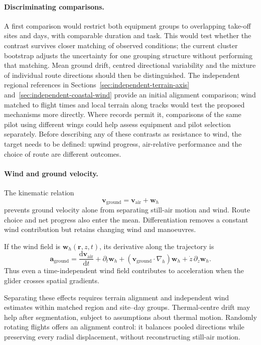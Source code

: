 \paragraph{Discriminating comparisons.}
A first comparison would restrict both equipment groups to overlapping take-off
sites and days, with comparable duration and task. This would test whether the
contrast survives closer matching of observed conditions; the current cluster
bootstrap adjusts the uncertainty for one grouping structure without performing
that matching. Mean ground drift, centred directional variability and the mixture
of individual route directions should then be distinguished. The independent
regional references in Sections~\ref{sec:independent-terrain-axis}
and~\ref{sec:independent-coastal-wind} provide an initial alignment comparison;
wind matched to flight times and local terrain along tracks would test the
proposed mechanisms more directly.
Where records permit it, comparisons of the same pilot using different wings could
help assess equipment and pilot selection separately. Before describing any of
these contrasts as resistance to wind, the target needs to be defined: upwind
progress, air-relative performance and the choice of route are different outcomes.

\paragraph{Wind and ground velocity.}

The kinematic relation
\begin{equation}
  \mathbf v_{\mathrm{ground}}=\mathbf v_{\mathrm{air}}+\mathbf w_h
  \label{eq:ground-air-wind}
\end{equation}
prevents ground velocity alone from separating still-air motion and wind.
Route choice and net progress also enter the mean. Differentiation removes a
constant wind contribution but retains changing wind and manoeuvres.

If the wind field is $\mathbf w_h(\mathbf r,z,t)$, its derivative along the trajectory is
\begin{equation}
 \mathbf a_{\mathrm{ground}}
 =\frac{\mathrm d\mathbf v_{\mathrm{air}}}{\mathrm dt}
  +\partial_t\mathbf w_h
  +(\mathbf v_{\mathrm{ground}}\!\cdot\nabla_h)\mathbf w_h
  +\dot z\,\partial_z\mathbf w_h.
 \label{eq:wind-acceleration}
\end{equation}
Thus even a time-independent wind field contributes to acceleration when the glider
crosses spatial gradients.

Separating these effects requires terrain alignment and independent wind estimates
within matched region and site--day groups. Thermal-centre drift may help after
segmentation, subject to assumptions about thermal motion. Randomly rotating flights
offers an alignment control: it balances pooled directions while preserving every
radial displacement, without reconstructing still-air motion.

\FloatBarrier


